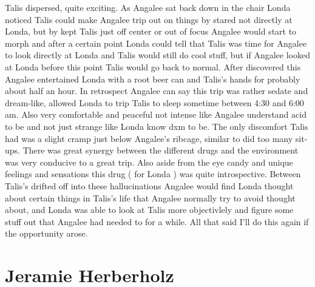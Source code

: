 \documentclass[12pt]{book}
\begin{document}
Talis dispersed, quite exciting. As Angalee sat back down in the chair Londa noticed Talis could make Angalee trip out on things by stared not directly at Londa, but by kept Talis just off center or out of focus Angalee would start to morph and after a certain point Londa could tell that Talis was time for Angalee to look directly at Londa and Talis would still do cool stuff, but if Angalee looked at Londa before this point Talis would go back to normal. After discovered this Angalee entertained Londa with a root beer can and Talis's hands for probably about half an hour. In retrospect Angalee can say this trip was rather sedate and dream-like, allowed Londa to trip Talis to sleep sometime between 4:30 and 6:00 am. Also very comfortable and peaceful not intense like Angalee understand acid to be and not just strange like Londa know dxm to be. The only discomfort Talis had was a slight cramp just below Angalee's ribcage, similar to did too many sit-ups. There was great synergy between the different drugs and the environment was very conducive to a great trip. Also aside from the eye candy and unique feelings and sensations this drug ( for Londa ) was quite introspective. Between Talis's drifted off into these hallucinations Angalee would find Londa thought about certain things in Talis's life that Angalee normally try to avoid thought about, and Londa was able to look at Talis more objectivlely and figure some stuff out that Angalee had needed to for a while. All that said I'll do this again if the opportunity arose.



\chapter{Jeramie Herberholz}
\end{document}
